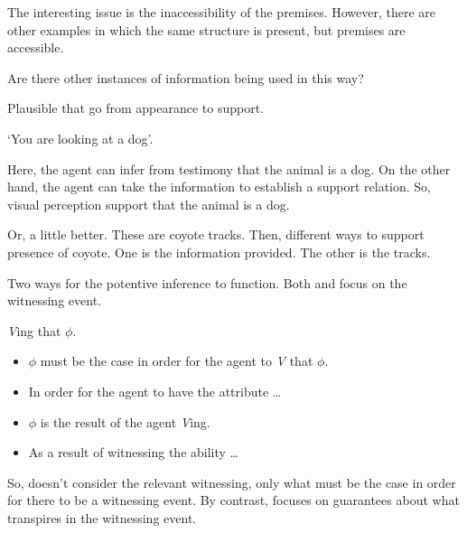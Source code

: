 \documentclass[10pt]{article}
\begin{document}
\begin{note}
  The interesting issue is the inaccessibility of the premises.
  However, there are other examples in which the same structure is present, but premises are accessible.
  
  Are there other instances of information being used in this way?

  Plausible that go from appearance to support.

  `You are looking at a dog'.

  Here, the agent can infer from testimony that the animal is a dog.
  On the other hand, the agent can take the information to establish a support relation.
  So, visual perception support that the animal is a dog.

  Or, a little better.
  These are coyote tracks.
  Then, different ways to support presence of coyote.
  One is the information provided.
  The other is the tracks.
\end{note}

\begin{note}
  Two ways for the potentive inference to function.
  Both \AR{} and \WR{} focus on the witnessing event.

  \emph{V}ing that \(\phi\).
  \begin{itemize}
  \item \(\phi\) must be the case in order for the agent to \emph{V} that \(\phi\).
  \item In order for the agent to have the attribute \dots
  \item \(\phi\) is the result of the agent \emph{V}ing.
  \item As a result of witnessing the ability \dots
  \end{itemize}

  So, \AR{} doesn't consider the relevant witnessing, only what must be the case in order for there to be a witnessing event.
  By contrast, \WR{} focuses on guarantees about what transpires in the witnessing event.
\end{note}

\subsubsection{\AR{}}
\label{sec:ar}



\subsubsection{\WR{}}
\label{sec:wr}
\end{document}

